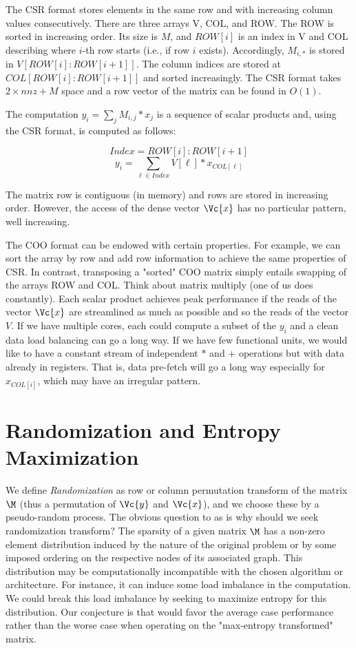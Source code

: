 \documentclass[acmsmall]{acmart}
\begin{document}
The CSR format stores elements in the same row and with increasing
column values consecutively. There are three arrays V, COL, and
ROW. The ROW is sorted in increasing order.  Its size is $M$, and
$ROW[i]$ is an index in V and COL describing where $i$-th row starts
(i.e., if row $i$ exists).  Accordingly, $M_{i,*}$ is stored in
$V[ROW[i]:ROW[i+1]]$. The column indices are stored at
$COL[ROW[i]:ROW[i+1]]$ and sorted increasingly. The CSR format takes
$2\times nnz + M$ space and a row vector of the matrix can be found in
$O(1)$.

The computation  $y_i = \sum_j M_{i,j}*x_j$ is a sequence of scalar
products and, using the CSR format, is computed as follows:

\[ Index = ROW[i]:ROW[i+1] \]
\[
y_i =  \sum_{\ell\in Index} V[\ell] * x_{COL[\ell]}  
\]

The matrix row is contiguous (in memory) and rows are stored in
increasing order. However, the access of the dense vector $\Vc{x}$ has
no particular pattern, well increasing.

The COO format can be endowed with certain properties. For example, we
can sort the array by row and add row information to achieve the same
properties of CSR. In contrast, transposing a "sorted" COO matrix
simply entails swapping of the arrays ROW and COL. Think about matrix
multiply (one of us does constantly).  Each scalar product achieves
peak performance if the reads of the vector $\Vc{x}$ are streamlined
as much as possible and so the reads of the vector $V$. If we have
multiple cores, each could compute a subset of the $y_i$ and a clean
data load balancing can go a long way. If we have few functional
units, we would like to have a constant stream of independent $*$ and
$+$ operations but with data already in registers. That is, data
pre-fetch will go a long way especially for $x_{COL[i]}$, which may
have an irregular pattern.


\section{Randomization and Entropy Maximization}
\label{sec:randomization}
We define {\em Randomization} as row or column permutation transform
of the matrix $\M$ (thus a permutation of $\Vc{y}$ and $\Vc{x}$), and
we choose these by a pseudo-random process. The obvious question to as
is why should we seek randomization transform?  The sparsity of a
given matrix $\M$ has a non-zero element distribution induced by the
nature of the original problem or by some imposed ordering on the
respective nodes of its associated graph.  This distribution may be
computationally incompatible with the chosen algorithm or
architecture. For instance, it can induce some load imbalance in the
computation.  We could break this load imbalance by seeking to
maximize entropy for this distribution. Our conjecture is that would
favor the average case performance rather than the worse case when
operating on the "max-entropy transformed" matrix.
\end{document}
